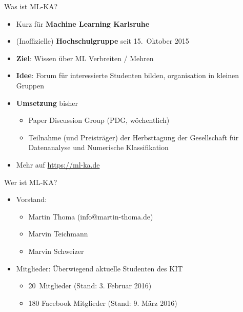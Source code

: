 \documentclass{beamer}
\begin{document}
\begin{frame}{Was ist ML-KA?}
    \begin{itemize}
        \item Kurz für \textbf{Machine Learning Karlsruhe}
        \item (Inoffizielle) \textbf{Hochschulgruppe} seit 15.~Oktober 2015
        \item \textbf{Ziel}: Wissen über ML Verbreiten / Mehren
        \item \textbf{Idee}: Forum für interessierte Studenten bilden,
              organisation in kleinen Gruppen
        \item \textbf{Umsetzung} bisher
        \begin{itemize}
            \item Paper Discussion Group (PDG, wöchentlich)
            \item Teilnahme (und Preisträger) der Herbsttagung der Gesellschaft
                  für Datenanalyse und Numerische Klassifikation
        \end{itemize}
        \item Mehr auf \href{https://ml-ka.de/}{https://ml-ka.de}
    \end{itemize}
\end{frame}

\begin{frame}{Wer ist ML-KA?}
    \begin{itemize}
        \item Vorstand:
        \begin{itemize}
            \item Martin Thoma (info@martin-thoma.de)
            \item Marvin Teichmann
            \item Marvin Schweizer
        \end{itemize}
        \item Mitglieder: Überwiegend aktuelle Studenten des KIT
        \begin{itemize}
            \item 20~Mitglieder (Stand: 3. Februar 2016)
            \item 180 Facebook Mitglieder (Stand: 9. März 2016)
        \end{itemize}
    \end{itemize}
\end{frame}
\end{document}
